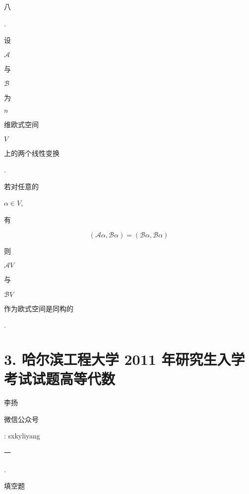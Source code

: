 \documentclass[10pt]{article}
\begin{document}
\begin{CJK}{UTF8}{mj}八\end{CJK}. \begin{CJK}{UTF8}{mj}设\end{CJK} $\mathscr{A}$ \begin{CJK}{UTF8}{mj}与\end{CJK} $\mathscr{B}$ \begin{CJK}{UTF8}{mj}为\end{CJK} $n$ \begin{CJK}{UTF8}{mj}维欧式空间\end{CJK} $V$ \begin{CJK}{UTF8}{mj}上的两个线性变换\end{CJK}. \begin{CJK}{UTF8}{mj}若对任意的\end{CJK} $\alpha \in V$, \begin{CJK}{UTF8}{mj}有\end{CJK}
$$
(\mathscr{A} \alpha, \mathscr{B} \alpha)=(\mathscr{B} \alpha, \mathscr{B} \alpha)
$$
\begin{CJK}{UTF8}{mj}则\end{CJK} $\mathscr{A} V$ \begin{CJK}{UTF8}{mj}与\end{CJK} $\mathscr{B} V$ \begin{CJK}{UTF8}{mj}作为欧式空间是同构的\end{CJK}.

\section{3. 哈尔滨工程大学 2011 年研究生入学考试试题高等代数}
\begin{CJK}{UTF8}{mj}李扬\end{CJK}

\begin{CJK}{UTF8}{mj}微信公众号\end{CJK}: sxkyliyang

\begin{CJK}{UTF8}{mj}一\end{CJK}. \begin{CJK}{UTF8}{mj}填空题\end{CJK}
\end{document}
